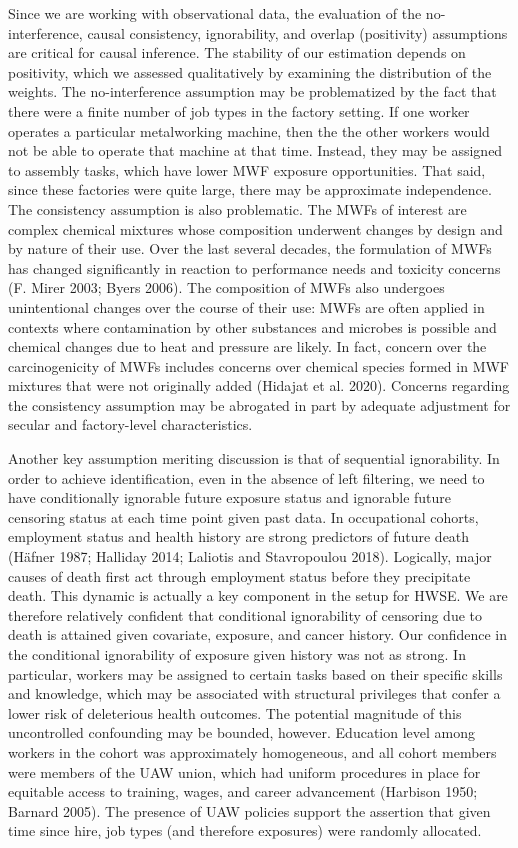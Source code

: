 \documentclass[
  11pt,
]{article}
\begin{document}
Since we are working with observational data, the evaluation of the
no-interference, causal consistency, ignorability, and overlap
(positivity) assumptions are critical for causal inference. The
stability of our estimation depends on positivity, which we assessed
qualitatively by examining the distribution of the weights. The
no-interference assumption may be problematized by the fact that there
were a finite number of job types in the factory setting. If one worker
operates a particular metalworking machine, then the the other workers
would not be able to operate that machine at that time. Instead, they
may be assigned to assembly tasks, which have lower MWF exposure
opportunities. That said, since these factories were quite large, there
may be approximate independence. The consistency assumption is also
problematic. The MWFs of interest are complex chemical mixtures whose
composition underwent changes by design and by nature of their use. Over
the last several decades, the formulation of MWFs has changed
significantly in reaction to performance needs and toxicity concerns (F.
Mirer 2003; Byers 2006). The composition of MWFs also undergoes
unintentional changes over the course of their use: MWFs are often
applied in contexts where contamination by other substances and microbes
is possible and chemical changes due to heat and pressure are likely. In
fact, concern over the carcinogenicity of MWFs includes concerns over
chemical species formed in MWF mixtures that were not originally added
(Hidajat et al. 2020). Concerns regarding the consistency assumption may
be abrogated in part by adequate adjustment for secular and
factory-level characteristics.

Another key assumption meriting discussion is that of sequential
ignorability. In order to achieve identification, even in the absence of
left filtering, we need to have conditionally ignorable future exposure
status and ignorable future censoring status at each time point given
past data. In occupational cohorts, employment status and health history
are strong predictors of future death (Häfner 1987; Halliday 2014;
Laliotis and Stavropoulou 2018). Logically, major causes of death first
act through employment status before they precipitate death. This
dynamic is actually a key component in the setup for HWSE. We are
therefore relatively confident that conditional ignorability of
censoring due to death is attained given covariate, exposure, and cancer
history. Our confidence in the conditional ignorability of exposure
given history was not as strong. In particular, workers may be assigned
to certain tasks based on their specific skills and knowledge, which may
be associated with structural privileges that confer a lower risk of
deleterious health outcomes. The potential magnitude of this
uncontrolled confounding may be bounded, however. Education level among
workers in the cohort was approximately homogeneous, and all cohort
members were members of the UAW union, which had uniform procedures in
place for equitable access to training, wages, and career advancement
(Harbison 1950; Barnard 2005). The presence of UAW policies support the
assertion that given time since hire, job types (and therefore
exposures) were randomly allocated.
\end{document}
